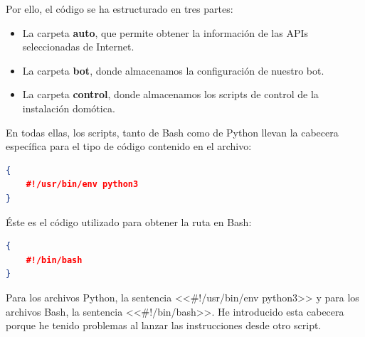 Por ello, el código se ha estructurado en tres partes:
\begin{itemize}
    \item La carpeta \textbf{auto}, que permite obtener la información de las APIs seleccionadas de Internet.
    \item La carpeta \textbf{bot}, donde almacenamos la configuración de nuestro bot.
    \item La carpeta \textbf{control}, donde almacenamos los scripts de control de la instalación domótica.
\end{itemize}

En todas ellas, los scripts, tanto de Bash como de Python llevan la cabecera específica para el tipo de código contenido en el archivo:

\begin{lstlisting}[language=json,firstnumber=0]
{
    #!/usr/bin/env python3
}
\end{lstlisting}

Éste es el código utilizado para obtener la ruta en Bash:
\begin{lstlisting}[language=json,firstnumber=0]
{
    #!/bin/bash
}
\end{lstlisting}


Para los archivos Python, la sentencia <<#!/usr/bin/env python3>> y para los archivos Bash, la sentencia <<#!/bin/bash>>. He introducido esta cabecera porque he tenido problemas al lanzar las instrucciones desde otro script.


